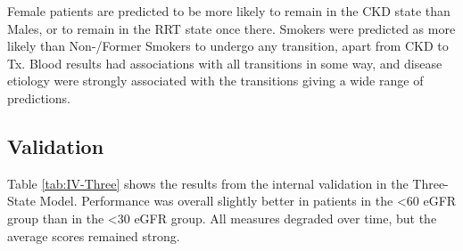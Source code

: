 \documentclass[12pt,PhD,twoside,openright]{muthesis}
\begin{document}
Female patients are predicted to be more likely to remain in the CKD state than Males, or to remain in the RRT state once there. Smokers were predicted as more likely than Non-/Former Smokers to undergo any transition, apart from CKD to Tx. Blood results had associations with all transitions in some way, and disease etiology were strongly associated with the transitions giving a wide range of predictions.

\hypertarget{validation-1}{%
\subsection{Validation}\label{validation-1}}

Table \ref{tab:IV-Three} shows the results from the internal validation in the Three-State Model. Performance was overall slightly better in patients in the \textless60 eGFR group than in the \textless30 eGFR group. All measures degraded over time, but the average scores remained strong.
\end{document}
